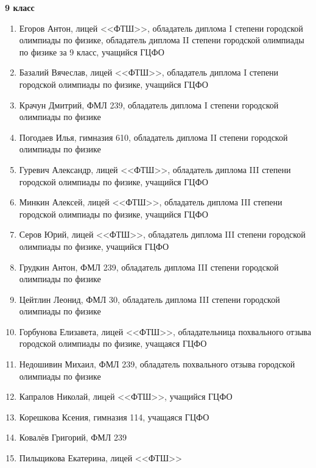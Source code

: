 \textbf{9 класс}
\begin{enumerate}
\item Егоров Антон, лицей <<ФТШ>>, обладатель диплома I степени городской олимпиады по физике, обладатель диплома II степени городской олимпиады по физике за 9 класс, учащийся ГЦФО
\item Базалий Вячеслав, лицей <<ФТШ>>, обладатель диплома I степени городской олимпиады по физике, учащийся ГЦФО
\item Крачун Дмитрий, ФМЛ 239, обладатель диплома I степени городской олимпиады по физике
\item Погодаев Илья, гимназия 610, обладатель диплома II степени городской олимпиады по физике
\item Гуревич Александр, лицей <<ФТШ>>, обладатель диплома III степени городской олимпиады по физике, учащийся ГЦФО
\item Минкин Алексей, лицей <<ФТШ>>, обладатель диплома III степени городской олимпиады по физике, учащийся ГЦФО
\item Серов Юрий, лицей <<ФТШ>>, обладатель диплома III степени городской олимпиады по физике, учащийся ГЦФО
\item Грудкин Антон, ФМЛ 239, обладатель диплома III степени городской олимпиады по физике
\item Цейтлин Леонид, ФМЛ 30, обладатель диплома III степени городской олимпиады по физике
\item Горбунова Елизавета, лицей <<ФТШ>>, обладательница похвального отзыва городской олимпиады по физике, учащаяся ГЦФО
\item Недошивин Михаил, ФМЛ 239, обладатель похвального отзыва городской олимпиады по физике
\item Капралов Николай, лицей <<ФТШ>>, учащийся ГЦФО
\item Корешкова Ксения, гимназия 114, учащаяся ГЦФО
\item Ковалёв Григорий, ФМЛ 239
\item Пильщикова Екатерина, лицей <<ФТШ>>
\end{enumerate}
